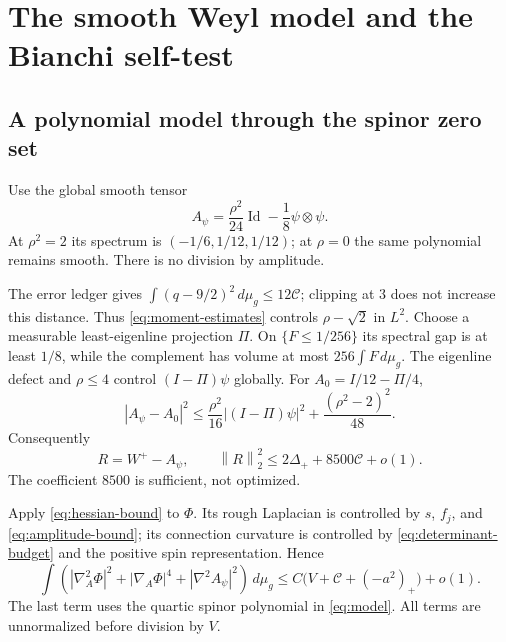 \documentclass[11pt,a4paper]{article}
\theoremstyle{definition}
\theoremstyle{remark}
\DeclareMathOperator{\Id}{Id}
\newcommand{\dd}{\,d\mu_g}
\newcommand{\norm}[1]{\left\|#1\right\|}
\numberwithin{equation}{section}
\begin{document}
\section{The smooth Weyl model and the Bianchi self-test}\label{sec:self-test}
\subsection{A polynomial model through the spinor zero set}\label{sub:Weyl-model}
Use the global smooth tensor
\begin{equation}\label{eq:model}
                 A_\psi=\frac{\rho^2}{24}\Id-\frac18\psi\otimes\psi.
\end{equation}
At $\rho^2=2$ its spectrum is $(-1/6,1/12,1/12)$; at $\rho=0$
the same polynomial remains smooth. There is no division by amplitude.

The error ledger gives $\int(q-9/2)^2\dd\le12\mathcal C$;
clipping at $3$ does not increase this distance. Thus
\eqref{eq:moment-estimates} controls $\rho-\sqrt2$ in $L^2$.
Choose a measurable least-eigenline projection $\Pi$. On
$\{F\le1/256\}$ its spectral gap is at least $1/8$, while the
complement has volume at most $256\int F\dd$. The eigenline defect
and $\rho\le4$ control $(I-\Pi)\psi$ globally. For
$A_0=I/12-\Pi/4$,
\[
 |A_\psi-A_0|^2\le\frac{\rho^2}{16}|(I-\Pi)\psi|^2+
                                      \frac{(\rho^2-2)^2}{48}.
\]
Consequently
\begin{equation}\label{eq:model-error}
 R=W^+-A_\psi,\qquad
                   \norm R_2^2\le2\Delta_++8500\mathcal C+o(1).
\end{equation}
The coefficient $8500$ is sufficient, not optimized.

Apply \eqref{eq:hessian-bound} to $\Phi$. Its rough Laplacian is
controlled by $s$, $f_j$, and \eqref{eq:amplitude-bound}; its connection
curvature is controlled by \eqref{eq:determinant-budget} and the positive
spin representation. Hence
\begin{equation}\label{eq:second-derivatives}
 \int\left(|\nabla_A^2\Phi|^2+|\nabla_A\Phi|^4+
                                  |\nabla^2A_\psi|^2\right)\dd
       \le C\bigl(V+\mathcal C+(-a^2)_+\bigr)+o(1).
\end{equation}
The last term uses the quartic spinor polynomial in \eqref{eq:model}.
All terms are unnormalized before division by $V$.
\end{document}
